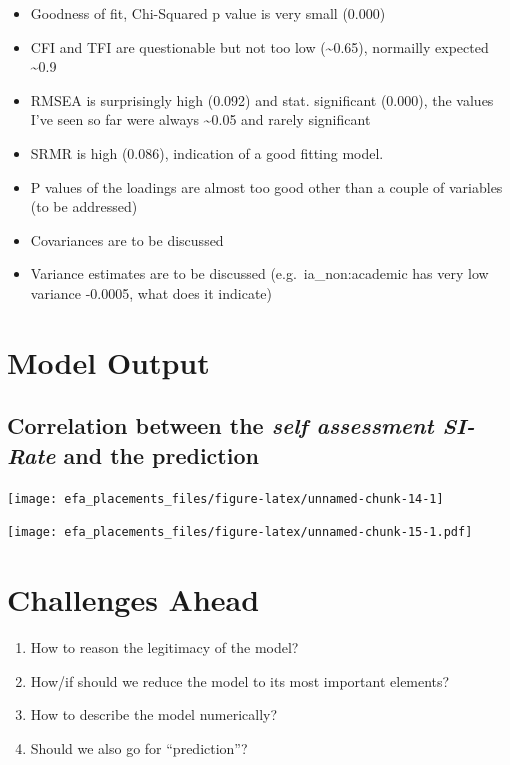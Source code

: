 \documentclass[
]{article}
\providecommand{\tightlist}{%
  \setlength{\itemsep}{0pt}\setlength{\parskip}{0pt}}
\begin{document}
\begin{itemize}
\tightlist
\item
  Goodness of fit, Chi-Squared p value is very small (0.000)
\item
  CFI and TFI are questionable but not too low (\textasciitilde0.65),
  normailly expected \textasciitilde0.9
\item
  RMSEA is surprisingly high (0.092) and stat. significant (0.000), the
  values I've seen so far were always \textasciitilde0.05 and rarely
  significant
\item
  SRMR is high (0.086), indication of a good fitting model.
\item
  P values of the loadings are almost too good other than a couple of
  variables (to be addressed)
\item
  Covariances are to be discussed
\item
  Variance estimates are to be discussed (e.g.~ia\_non:academic has very
  low variance -0.0005, what does it indicate)
\end{itemize}

\hypertarget{model-output}{%
\section{Model Output}\label{model-output}}

\hypertarget{correlation-between-the-self-assessment-si-rate-and-the-prediction}{%
\subsection{\texorpdfstring{Correlation between the \emph{self
assessment SI-Rate} and the
prediction}{Correlation between the self assessment SI-Rate and the prediction}}\label{correlation-between-the-self-assessment-si-rate-and-the-prediction}}

\begin{center}\texttt{[image: efa\_placements\_files/figure-latex/unnamed-chunk-14-1]} \end{center}

\texttt{[image: efa\_placements\_files/figure-latex/unnamed-chunk-15-1.pdf]}

\hypertarget{challenges-ahead}{%
\section{Challenges Ahead}\label{challenges-ahead}}

\begin{enumerate}
\def\labelenumi{\arabic{enumi}.}
\tightlist
\item
  How to reason the legitimacy of the model?
\item
  How/if should we reduce the model to its most important elements?
\item
  How to describe the model numerically?
\item
  Should we also go for ``prediction''?
\end{enumerate}
\end{document}
